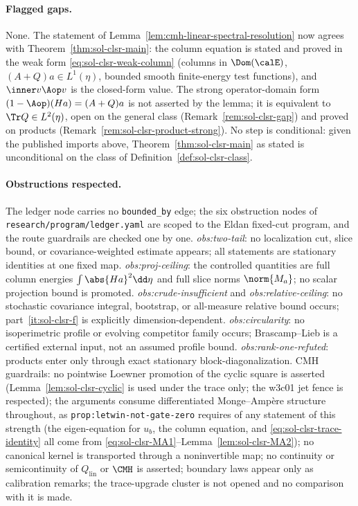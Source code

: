 \documentclass[../main.tex]{subfiles}
\begin{document}
\paragraph{Flagged gaps.}
None.  The statement of Lemma~\ref{lem:cmh-linear-spectral-resolution} now agrees with
Theorem~\ref{thm:sol-clsr-main}: the column equation is stated and proved in the weak form
\eqref{eq:sol-clsr-weak-column} (columns in $\Dom(\calE)$, $(A+Q)a\in L^1(\eta)$, bounded
smooth finite-energy test functions), and $\inner v{\Aop v}$ is the closed-form value.  The
strong operator-domain form $(1-\Aop)(Ha)=(A+Q)a$ is not asserted by the lemma; it is
equivalent to $\Tr Q\in L^2(\eta)$, open on the general class (Remark~\ref{rem:sol-clsr-gap})
and proved on products (Remark~\ref{rem:sol-clsr-product-strong}).  No step is conditional:
given the published imports above, Theorem~\ref{thm:sol-clsr-main} as stated is
unconditional on the class of Definition~\ref{def:sol-clsr-class}.

\paragraph{Obstructions respected.}
The ledger node carries no \texttt{bounded\_by} edge; the six obstruction nodes of
\texttt{research/program/ledger.yaml} are scoped to the Eldan fixed-cut program, and the route
guardrails are checked one by one.
\emph{obs:two-tail}: no localization cut, slice bound, or covariance-weighted estimate
appears; all statements are stationary identities at one fixed map.
\emph{obs:proj-ceiling}: the controlled quantities are full column energies
$\int\abs{Ha}^2\dd\eta$ and full slice norms $\norm{M_a}$; no scalar projection bound is
promoted.
\emph{obs:crude-insufficient} and \emph{obs:relative-ceiling}: no stochastic covariance
integral, bootstrap, or all-measure relative bound occurs; part~\ref{it:sol-clsr-f} is
explicitly dimension-dependent.
\emph{obs:circularity}: no isoperimetric profile or evolving competitor family occurs;
Brascamp--Lieb is a certified external input, not an assumed profile bound.
\emph{obs:rank-one-refuted}: products enter only through exact stationary
block-diagonalization.
CMH guardrails: no pointwise Loewner promotion of the cyclic square is asserted
(Lemma~\ref{lem:sol-clsr-cyclic} is used under the trace only; the w3c01 jet fence is
respected); the arguments consume differentiated Monge--Amp\`ere structure throughout, as
\texttt{prop:letwin-not-gate-zero} requires of any statement of this strength (the
eigen-equation for $u_b$, the column equation, and \eqref{eq:sol-clsr-trace-identity} all come
from \eqref{eq:sol-clsr-MA1}--Lemma~\ref{lem:sol-clsr-MA2}); no canonical kernel is
transported through a noninvertible map; no continuity or semicontinuity of
$Q_{\mathrm{lin}}$ or $\CMH$ is asserted; boundary laws appear only as calibration remarks;
the trace-upgrade cluster is not opened and no comparison with it is made.

\end{document}

